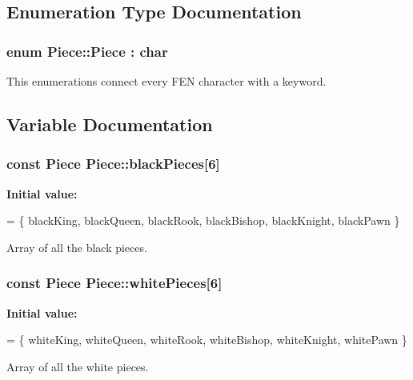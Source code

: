 \subsection{Enumeration Type Documentation}
\subsubsection[{\texorpdfstring{Piece}{Piece}}]{\setlength{\rightskip}{0pt plus 5cm}enum {\bf Piece\+::\+Piece} \+: char}\hypertarget{namespacePiece_a588233307aa6bdb32c1d62c9f20895cc}{}\label{namespacePiece_a588233307aa6bdb32c1d62c9f20895cc}
This enumerations connect every F\+EN character with a keyword. 

\subsection{Variable Documentation}
\subsubsection[{\texorpdfstring{black\+Pieces}{blackPieces}}]{\setlength{\rightskip}{0pt plus 5cm}const {\bf Piece} Piece\+::black\+Pieces\mbox{[}6\mbox{]}\hspace{0.3cm}{\ttfamily [static]}}\hypertarget{namespacePiece_a531c90c92acec2708048ce3b9caddf2a}{}\label{namespacePiece_a531c90c92acec2708048ce3b9caddf2a}
{\bfseries Initial value\+:}
\begin{DoxyCode}
=
\{ blackKing, blackQueen, blackRook, blackBishop, blackKnight, blackPawn \}
\end{DoxyCode}
Array of all the black pieces. 
\subsubsection[{\texorpdfstring{white\+Pieces}{whitePieces}}]{\setlength{\rightskip}{0pt plus 5cm}const {\bf Piece} Piece\+::white\+Pieces\mbox{[}6\mbox{]}\hspace{0.3cm}{\ttfamily [static]}}\hypertarget{namespacePiece_a8c9ba77d6f9a9bb67a5a5d8e95a9f945}{}\label{namespacePiece_a8c9ba77d6f9a9bb67a5a5d8e95a9f945}
{\bfseries Initial value\+:}
\begin{DoxyCode}
=
\{ whiteKing, whiteQueen, whiteRook, whiteBishop, whiteKnight, whitePawn \}
\end{DoxyCode}
Array of all the white pieces. 